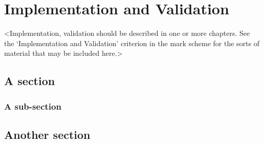 \chapter{Implementation and Validation}
\label{chapter3}

<Implementation, validation should be described in one or more chapters. See the `Implementation and Validation' criterion in the mark scheme for the sorts of material that may be included here.>

\section{A section}
\lipsum[8]

\subsection{A sub-section}
\lipsum[11]

\section{Another section}
\lipsum[12]

